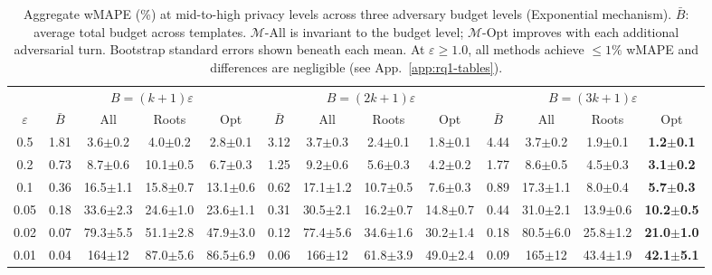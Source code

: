\providecommand{\pmstd}[1]{{\scriptsize $\pm$#1}}

\begin{table}[t]
\centering
\setlength{\tabcolsep}{2.8pt}
\small
\caption{Aggregate wMAPE (\%) at mid-to-high privacy levels across three adversary budget levels (Exponential mechanism). $\bar{B}$: average total budget across templates. $\mathcal{M}$-All is invariant to the budget level; $\mathcal{M}$-Opt improves with each additional adversarial turn. Bootstrap standard errors shown beneath each mean. At $\varepsilon \geq 1.0$, all methods achieve $\leq 1\%$ wMAPE and differences are negligible (see App.~\ref{app:rq1-tables}).}
\label{tab:double_asymmetry}
\begin{tabular}{c|cccc|cccc|cccc}
\toprule
& \multicolumn{4}{c|}{$B = (k{+}1)\varepsilon$} & \multicolumn{4}{c|}{$B = (2k{+}1)\varepsilon$} & \multicolumn{4}{c}{$B = (3k{+}1)\varepsilon$} \\
$\varepsilon$ & $\bar{B}$ & All & Roots & Opt & $\bar{B}$ & All & Roots & Opt & $\bar{B}$ & All & Roots & Opt \\
\midrule
0.5 & 1.81 & 3.6\pmstd{0.2} & 4.0\pmstd{0.2} & 2.8\pmstd{0.1} & 3.12 & 3.7\pmstd{0.3} & 2.4\pmstd{0.1} & 1.8\pmstd{0.1} & 4.44 & 3.7\pmstd{0.2} & 1.9\pmstd{0.1} & \textbf{1.2\pmstd{0.1}} \\
0.2 & 0.73 & 8.7\pmstd{0.6} & 10.1\pmstd{0.5} & 6.7\pmstd{0.3} & 1.25 & 9.2\pmstd{0.6} & 5.6\pmstd{0.3} & 4.2\pmstd{0.2} & 1.77 & 8.6\pmstd{0.5} & 4.5\pmstd{0.3} & \textbf{3.1\pmstd{0.2}} \\
0.1 & 0.36 & 16.5\pmstd{1.1} & 15.8\pmstd{0.7} & 13.1\pmstd{0.6} & 0.62 & 17.1\pmstd{1.2} & 10.7\pmstd{0.5} & 7.6\pmstd{0.3} & 0.89 & 17.3\pmstd{1.1} & 8.0\pmstd{0.4} & \textbf{5.7\pmstd{0.3}} \\
0.05 & 0.18 & 33.6\pmstd{2.3} & 24.6\pmstd{1.0} & 23.6\pmstd{1.1} & 0.31 & 30.5\pmstd{2.1} & 16.2\pmstd{0.7} & 14.8\pmstd{0.7} & 0.44 & 31.0\pmstd{2.1} & 13.9\pmstd{0.6} & \textbf{10.2\pmstd{0.5}} \\
0.02 & 0.07 & 79.3\pmstd{5.5} & 51.1\pmstd{2.8} & 47.9\pmstd{3.0} & 0.12 & 77.4\pmstd{5.6} & 34.6\pmstd{1.6} & 30.2\pmstd{1.4} & 0.18 & 80.5\pmstd{6.0} & 25.8\pmstd{1.2} & \textbf{21.0\pmstd{1.0}} \\
0.01 & 0.04 & 164\pmstd{12} & 87.0\pmstd{5.6} & 86.5\pmstd{6.9} & 0.06 & 166\pmstd{12} & 61.8\pmstd{3.9} & 49.0\pmstd{2.4} & 0.09 & 165\pmstd{12} & 43.4\pmstd{1.9} & \textbf{42.1\pmstd{5.1}} \\
\bottomrule
\end{tabular}
\end{table}
